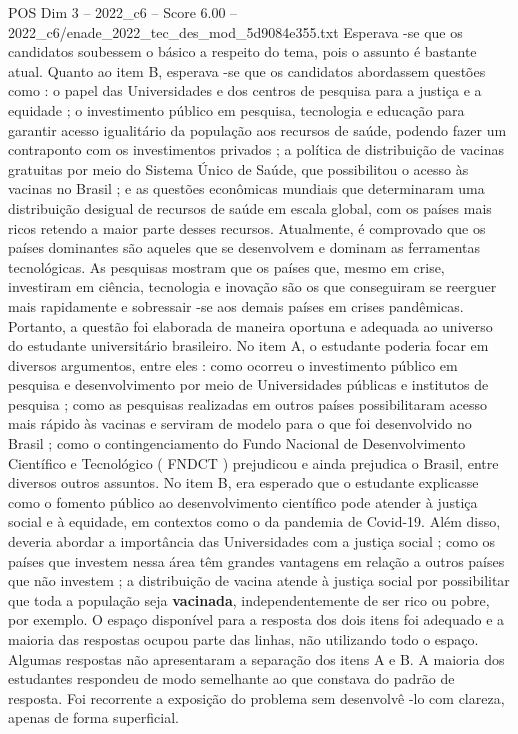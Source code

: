 \begin{textsample}{POS Dim 3 – 2022\_c6 – Score 6.00 – 2022\_c6/enade\_2022\_tec\_des\_mod\_5d9084e355.txt}
Esperava -se que os candidatos soubessem o básico a respeito do tema, pois o assunto é bastante atual.
Quanto ao item B, esperava -se que os candidatos abordassem questões como : o papel das Universidades e dos centros de pesquisa para a justiça e a equidade ; o investimento público em pesquisa, tecnologia e educação para garantir acesso igualitário da população aos recursos de saúde, podendo fazer um contraponto com os investimentos privados ; a política de distribuição de vacinas gratuitas por meio do Sistema Único de Saúde, que possibilitou o acesso às vacinas no Brasil ; e as questões econômicas mundiais que determinaram uma distribuição desigual de recursos de saúde em escala global, com os países mais ricos retendo a maior parte desses recursos.
Atualmente, é comprovado que os países dominantes são aqueles que se desenvolvem e dominam as ferramentas tecnológicas.
As pesquisas mostram que os países que, mesmo em crise, investiram em ciência, tecnologia e inovação são os que conseguiram se reerguer mais rapidamente e sobressair -se aos demais países em crises pandêmicas.
Portanto, a questão foi elaborada de maneira oportuna e adequada ao universo do estudante universitário brasileiro.
No item A, o estudante poderia focar em diversos argumentos, entre eles : como ocorreu o investimento público em pesquisa e desenvolvimento por meio de Universidades públicas e institutos de pesquisa ; como as pesquisas realizadas em outros países possibilitaram acesso mais rápido às vacinas e serviram de modelo para o que foi desenvolvido no Brasil ; como o contingenciamento do Fundo Nacional de Desenvolvimento Científico e Tecnológico ( FNDCT ) prejudicou e ainda prejudica o Brasil, entre diversos outros assuntos.
No item B, era esperado que o estudante explicasse como o fomento público ao desenvolvimento científico pode atender à justiça social e à equidade, em contextos como o da pandemia de Covid-19.
Além disso, deveria abordar a importância das Universidades com a justiça social ; como os países que investem nessa área têm grandes vantagens em relação a outros países que não investem ; a distribuição de vacina atende à justiça social por possibilitar que toda a população seja \textbf{vacinada}, independentemente de ser rico ou pobre, por exemplo.
O espaço disponível para a resposta dos dois itens foi adequado e a maioria das respostas ocupou parte das linhas, não utilizando todo o espaço.
Algumas respostas não apresentaram a separação dos itens A e B.
A maioria dos estudantes respondeu de modo semelhante ao que constava do padrão de resposta.
Foi recorrente a exposição do problema sem desenvolvê -lo com clareza, apenas de forma superficial.

\end{textsample}
